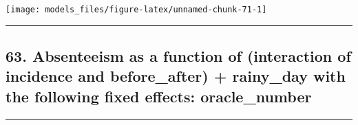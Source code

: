 \documentclass[]{article}
\begin{document}
\begin{center}\texttt{[image: models\_files/figure-latex/unnamed-chunk-71-1]} \end{center}

\newpage

\begin{center}\rule{0.5\linewidth}{\linethickness}\end{center}

\subsection{63. Absenteeism as a function of (interaction of incidence
and before\_after) + rainy\_day with the following fixed effects:
oracle\_number}\label{absenteeism-as-a-function-of-interaction-of-incidence-and-before_after-rainy_day-with-the-following-fixed-effects-oracle_number-1}

\begin{center}\rule{0.5\linewidth}{\linethickness}\end{center}
\end{document}

